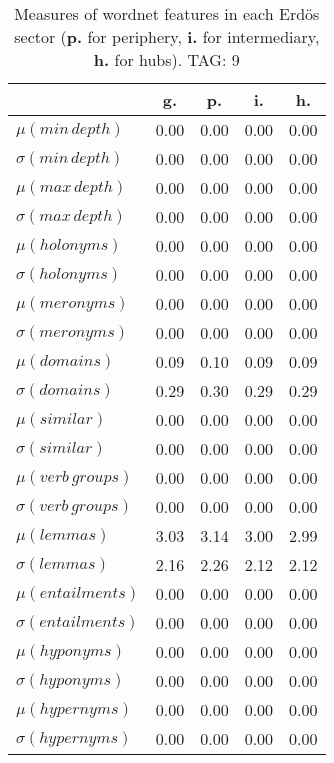 \begin{table}[h!]
\begin{center}
\begin{tabular}{| l || c | c | c | c |}\hline
 & {\bf g.} & {\bf p.} & {\bf i.} & {\bf h.} \\\hline\hline
$\mu(min\,depth)$ & 0.00  & 0.00  & 0.00  & 0.00 \\
$\sigma(min\,depth)$ & 0.00  & 0.00  & 0.00  & 0.00 \\\hline
$\mu(max\,depth)$ & 0.00  & 0.00  & 0.00  & 0.00 \\
$\sigma(max\,depth)$ & 0.00  & 0.00  & 0.00  & 0.00 \\\hline
$\mu(holonyms)$ & 0.00  & 0.00  & 0.00  & 0.00 \\
$\sigma(holonyms)$ & 0.00  & 0.00  & 0.00  & 0.00 \\\hline
$\mu(meronyms)$ & 0.00  & 0.00  & 0.00  & 0.00 \\
$\sigma(meronyms)$ & 0.00  & 0.00  & 0.00  & 0.00 \\\hline
$\mu(domains)$ & 0.09  & 0.10  & 0.09  & 0.09 \\
$\sigma(domains)$ & 0.29  & 0.30  & 0.29  & 0.29 \\\hline
$\mu(similar)$ & 0.00  & 0.00  & 0.00  & 0.00 \\
$\sigma(similar)$ & 0.00  & 0.00  & 0.00  & 0.00 \\\hline
$\mu(verb\,groups)$ & 0.00  & 0.00  & 0.00  & 0.00 \\
$\sigma(verb\,groups)$ & 0.00  & 0.00  & 0.00  & 0.00 \\\hline
$\mu(lemmas)$ & 3.03  & 3.14  & 3.00  & 2.99 \\
$\sigma(lemmas)$ & 2.16  & 2.26  & 2.12  & 2.12 \\\hline
$\mu(entailments)$ & 0.00  & 0.00  & 0.00  & 0.00 \\
$\sigma(entailments)$ & 0.00  & 0.00  & 0.00  & 0.00 \\\hline
$\mu(hyponyms)$ & 0.00  & 0.00  & 0.00  & 0.00 \\
$\sigma(hyponyms)$ & 0.00  & 0.00  & 0.00  & 0.00 \\\hline
$\mu(hypernyms)$ & 0.00  & 0.00  & 0.00  & 0.00 \\
$\sigma(hypernyms)$ & 0.00  & 0.00  & 0.00  & 0.00 \\\hline
\end{tabular}
\caption{Measures of wordnet features in each Erd\"os sector ({{\bf p.}} for periphery, {{\bf i.}} for intermediary, {{\bf h.}} for hubs). TAG: 9}
\end{center}
\end{table}